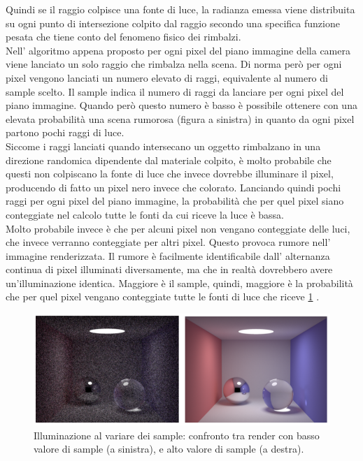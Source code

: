 Quindi se il raggio colpisce una fonte di luce, la radianza emessa viene distribuita su ogni punto di intersezione colpito dal raggio secondo una specifica funzione pesata che tiene conto del fenomeno fisico dei rimbalzi.
\\
Nell’ algoritmo appena proposto per ogni pixel del piano immagine della camera viene lanciato un solo raggio che rimbalza nella scena. Di norma però per ogni pixel vengono lanciati un numero elevato di raggi, equivalente al numero di sample scelto. Il sample indica il numero di raggi da lanciare per ogni pixel del piano immagine.
Quando però questo numero è basso è possibile ottenere con una elevata probabilità una scena rumorosa (figura a sinistra) in quanto da ogni pixel partono pochi raggi di luce.
\\
Siccome i raggi lanciati quando intersecano un oggetto rimbalzano in una direzione randomica dipendente dal materiale colpito, è molto probabile che questi non colpiscano la fonte di luce che invece dovrebbe illuminare il pixel, producendo di fatto un pixel nero invece che colorato. 
Lanciando quindi pochi raggi per ogni pixel del piano immagine, la probabilità che per quel pixel siano conteggiate nel calcolo tutte le fonti da cui riceve la luce è bassa.
\\
Molto probabile invece è che per alcuni pixel non vengano conteggiate delle luci, che invece verranno conteggiate per altri pixel. Questo provoca rumore nell’ immagine renderizzata. 
Il rumore è facilmente identificabile dall’ alternanza continua di pixel illuminati diversamente, ma che in realtà dovrebbero avere un’illuminazione identica.
Maggiore è il sample, quindi, maggiore è la probabilità che per quel pixel vengano conteggiate tutte le fonti di luce che riceve \ref{fig:stato_arte_effetto_sampling} .
\\
\begin{figure}[htb]
 \centering
 \includegraphics[width=0.75\linewidth]{images/chapter_stato_arte/stato_arte_effetto_sampling.png}\hfill
 \caption[Illuminazione al variare dei sample]{Illuminazione al variare dei sample: confronto tra render con basso valore di sample (a sinistra), e alto valore di sample (a destra).}
 \label{fig:stato_arte_effetto_sampling}
\end{figure}
